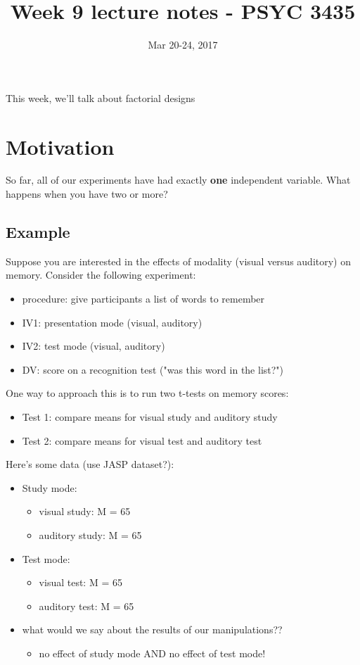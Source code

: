 \documentclass[11pt]{article}
\date{Mar 20-24, 2017}
\title{Week 9 lecture notes - PSYC 3435}
\begin{document}
\maketitle
This week, we'll talk about factorial designs

\section*{Motivation}
\label{sec-1}
So far, all of our experiments have had exactly \textbf{one} independent variable.  What happens when you have two or more?

\subsection*{Example}
\label{sec-1-1}
Suppose you are interested in the effects of modality (visual versus auditory) on memory.  Consider the following experiment:
\begin{itemize}
\item procedure: give participants a list of words to remember
\item IV1: presentation mode (visual, auditory)
\item IV2: test mode (visual, auditory)
\item DV: score on a recognition test ("was this word in the list?")
\end{itemize}

One way to approach this is to run two t-tests on memory scores:
\begin{itemize}
\item Test 1: compare means for visual study and auditory study
\item Test 2: compare means for visual test and auditory test
\end{itemize}

Here's some data (use JASP dataset?):
\begin{itemize}
\item Study mode:
\begin{itemize}
\item visual study: M = 65
\item auditory study: M = 65
\end{itemize}

\item Test mode:
\begin{itemize}
\item visual test: M = 65
\item auditory test: M = 65
\end{itemize}

\item what would we say about the results of our manipulations??
\begin{itemize}
\item no effect of study mode AND no effect of test mode!
\end{itemize}
\end{itemize}
\end{document}
